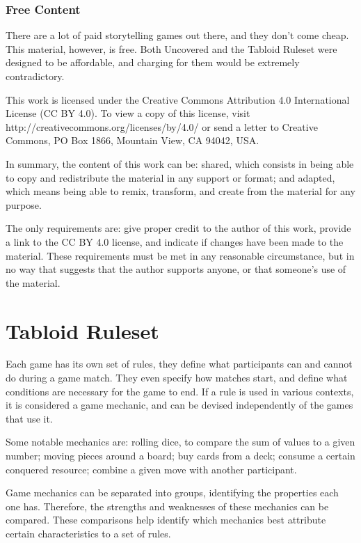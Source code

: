 \documentclass[11pt]{article}
\begin{document}
\begin{multicols}{2}
\section{Free Content}

There are a lot of paid storytelling games out there, and they don't come cheap. This material, however, is free. Both Uncovered and the Tabloid Ruleset were designed to be affordable, and charging for them would be extremely contradictory.

This work is licensed under the Creative Commons Attribution 4.0 International License (CC BY 4.0). To view a copy of this license, visit http://creativecommons.org/licenses/by/4.0/ or send a letter to Creative Commons, PO Box 1866, Mountain View, CA 94042, USA.

In summary, the content of this work can be: shared, which consists in being able to copy and redistribute the material in any support or format; and adapted, which means being able to remix, transform, and create from the material for any purpose.

The only requirements are: give proper credit to the author of this work, provide a link to the CC BY 4.0 license, and indicate if changes have been made to the material. These requirements must be met in any reasonable circumstance, but in no way that suggests that the author supports anyone, or that someone's use of the material.

\part{Tabloid Ruleset}

Each game has its own set of rules, they define what participants can and cannot do during a game match. They even specify how matches start, and define what conditions are necessary for the game to end. If a rule is used in various contexts, it is considered a game mechanic, and can be devised independently of the games that use it.

Some notable mechanics are: rolling dice, to compare the sum of values to a given number; moving pieces around a board; buy cards from a deck; consume a certain conquered resource; combine a given move with another participant.

Game mechanics can be separated into groups, identifying the properties each one has. Therefore, the strengths and weaknesses of these mechanics can be compared. These comparisons help identify which mechanics best attribute certain characteristics to a set of rules.


\end{multicols}
\end{document}

